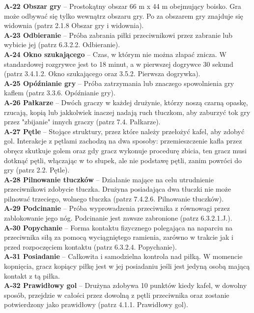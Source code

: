 \documentclass[12pt,a4paper]{article}
\begin{document}
\textbf{A-22 Obszar gry} – Prostokątny obszar 66 m x 44 m obejmujący boisko. Gra może odbywać się tylko wewnątrz obszaru gry. Po za obszarem gry znajduje się widownia (patrz 2.1.8 Obszar gry i widownia).\\
\textbf{A-23 Odbieranie} – Próba zabrania piłki przeciwnikowi przez zabranie lub wybicie jej (patrz 6.3.2.2. Odbieranie).\\
\textbf{A-24 Okno szukającego} – Czas, w którym nie można złapać znicza. W standardowej rozgrywce jest to 18 minut, a w pierwszej dogrywce 30 sekund (patrz 3.4.1.2. Okno szukającego oraz 3.5.2. Pierwsza dogrywka).\\
\textbf{A-25 Opóźnianie gry} – Próba zatrzymania lub znaczego spowolnienia gry kaflem (patrz 3.3.6. Opóźnianie gry).\\
\textbf{A-26 Pałkarze} – Dwóch graczy w każdej drużynie, którzy noszą czarną opaskę, rzucają, kopią lub jakkolwiek inaczej nadają ruch tłuczkom, aby zaburzyć tok gry przez "zbijanie" innych graczy (patrz 7.4. Pałkarze).\\
\textbf{A-27 Pętle} – Stojące struktury, przez które należy przełożyć kafel, aby zdobyć gol. Interakcje z pętlami zachodzą na dwa sposoby: przemieszczenie kafla przez obręcz skutkuje golem oraz gdy gracz wykonuje procedurę zbicia, ten gracz musi dotknąć pętli, włączając w to słupek, ale nie podstawę pętli, zanim powróci do gry (patrz 2.2. Pętle).\\
\textbf{A-28 Pilnowanie tłuczków} – Działanie mające na celu utrudnienie przeciwnikowi zdobycie tłuczka. Drużyna posiadająca dwa tłuczki nie może pilnować trzeciego, wolnego tłuczka (patrz 7.4.2.6. Pilnowanie tłuczków).\\
\textbf{A-29 Podcinanie} – Próba wyprowadzenia przeciwnika z równowagi przez zablokowanie jego nóg. Podcinanie jest zawsze zabronione (patrz 6.3.2.1.J.).\\
\textbf{A-30 Popychanie} – Forma kontaktu fizycznego polegająca na naparciu na przeciwnika siłą za pomocą wyciągniętego ramienia, zarówno w trakcie jak i przed rozpoczęciem kontaktu (patrz 6.3.2.4. Popychanie).\\
\textbf{A-31 Posiadanie} – Całkowita i samodzielna kontrola nad piłką. W momencie kopnięcia, gracz kopiący piłkę jest w jej posiadaniu jeśli jest jedyną osobą mającą kontakt z tą piłka.\\
\textbf{A-32 Prawidłowy gol} – Drużyna zdobywa 10 punktów kiedy kafel, w dowolny sposób, przejdzie w całości przez dowolną z pętli przeciwnika oraz zostanie potwierdzony jako prawidłowy (patrz 4.1.1. Prawidłowy gol).\\
\end{document}
